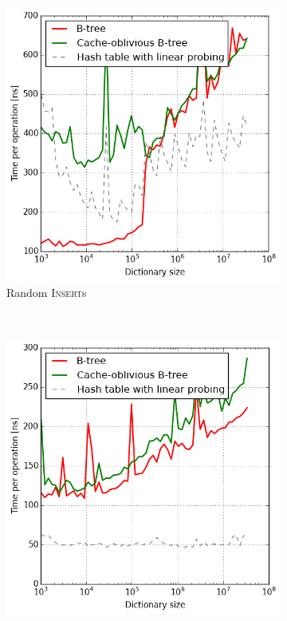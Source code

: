 \begin{figure}
\begin{subfigure}[t]{0.45\textwidth}
	\includegraphics[width=\textwidth]{img/performance/cob-performance-2}
	\caption{Random \textsc{Insert}s}
\end{subfigure}
~
\begin{subfigure}[t]{0.45\textwidth}
	\includegraphics[width=\textwidth]{img/performance/cob-performance-3}

\end{subfigure}
\end{figure}
